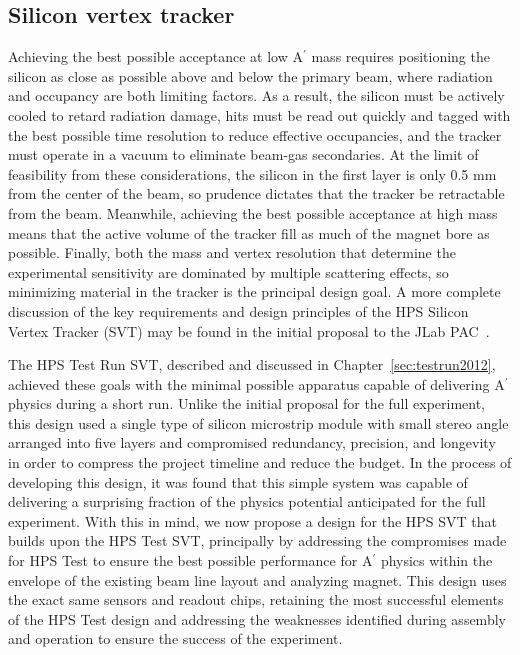 \subsection{Silicon vertex tracker}
\label{sec:svt}

Achieving the best possible acceptance at low A$^\prime$ mass requires positioning the silicon as close as possible above and below the primary beam, where radiation and occupancy are both limiting factors.  As a result, the silicon must be actively cooled to retard radiation damage, hits must be read out quickly and tagged with the best possible time resolution to reduce effective occupancies, and the tracker must operate in a vacuum to eliminate beam-gas secondaries.  At the limit of feasibility from these considerations, the silicon in the first layer is only 0.5 mm from the center of the beam, so prudence dictates that the tracker be retractable from the beam. Meanwhile, achieving the best possible acceptance at high mass means that the active volume of the tracker fill as much of the magnet bore as possible.  Finally, both the mass and vertex resolution that determine the experimental sensitivity are dominated by multiple scattering effects, so minimizing material in the tracker is the principal design goal. A more complete discussion of the key requirements and design principles of the HPS Silicon Vertex Tracker (SVT) may be found in the initial proposal to the JLab PAC~\cite{HPS_PROP}.  

The HPS Test Run SVT, described and discussed in Chapter~\ref{sec:testrun2012}, achieved these goals with the minimal possible apparatus capable of delivering A$^\prime$ physics during a short run. Unlike the initial proposal for the full experiment, this design used a single type of silicon microstrip module with small stereo angle arranged into five layers and compromised redundancy, precision, and longevity in order to compress the project timeline and reduce the budget. In the process of developing this design, it was found that this simple system was capable of delivering a surprising fraction of the physics potential anticipated for the full experiment.  With this in mind, we now propose a design for the HPS SVT that builds upon the HPS Test SVT, principally by addressing the compromises made for HPS Test to ensure the best possible performance for A$^\prime$ physics within the envelope of the existing beam line layout and analyzing magnet.  This design uses the exact same sensors and readout chips, retaining the most successful elements of the HPS Test design and addressing the weaknesses identified during assembly and operation to ensure the success of the experiment.


